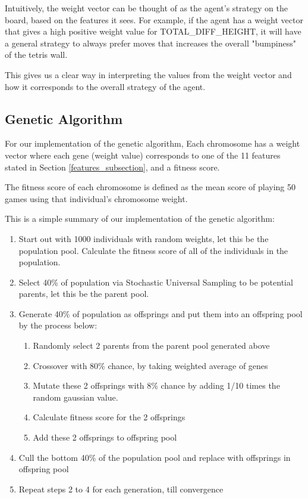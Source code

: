 \documentclass[a4paper,12pt,twocolumn]{article}
\begin{document}
Intuitively, the weight vector can be thought of as the agent's strategy on
the board, based on the features it sees. For example, if the agent has a weight
vector that gives a high positive weight value for TOTAL\_DIFF\_HEIGHT, it will have
a general strategy to always prefer moves that increases the overall "bumpiness" of
the tetris wall.

This gives us a clear way in interpreting the values from the weight vector and how
it corresponds to the overall strategy of the agent.

\subsection{Genetic Algorithm}
\label{genetic}
For our implementation of the genetic algorithm, Each chromosome has a weight
vector where each gene (weight value) corresponds to one of the 11 features
stated in Section \ref{features_subsection}, and a fitness score.


The fitness score of each chromosome is defined as the mean score of playing 50
games using that individual's chromosome weight.

This is a simple summary of our implementation of the genetic algorithm:


\begin{enumerate}
    \itemsep-0.3em
    \item Start out with 1000 individuals with random weights, let this be the population pool.
    Calculate the fitness score of all of the individuals in the population.
    \item Select 40\% of population via Stochastic Universal Sampling to be
            potential parents, let this be the parent pool.
    \item Generate 40\% of population as offsprings and put them into an offspring pool
    by the process below:
        \begin{enumerate}
            \itemsep-0.15em
            \item Randomly select 2 parents from the parent pool generated above
            \item Crossover with 80\% chance, by taking weighted average of genes
            \item Mutate these 2 offsprings with 8\% chance by adding 1/10 times
                the random gaussian value.
            \item Calculate fitness score for the 2 offsprings
            \item Add these 2 offsprings to offspring pool
        \end{enumerate}
    \item Cull the bottom 40\% of the population pool and replace with offsprings
    in offspring pool
    \item Repeat steps 2 to 4 for each generation, till convergence
\end{enumerate}
\end{document}
